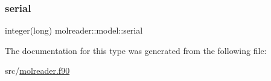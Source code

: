 \mbox{\label{structmolreader_1_1model_aff0c60ac8af22248ab65fa453bf87e6a}} 
\subsubsection{\texorpdfstring{serial}{serial}}
{\footnotesize\ttfamily integer(long) molreader\+::model\+::serial\hspace{0.3cm}{\ttfamily [private]}}



The documentation for this type was generated from the following file\+:\begin{DoxyCompactItemize}
\item 
src/\hyperlink{molreader_8f90}{molreader.\+f90}\end{DoxyCompactItemize}
